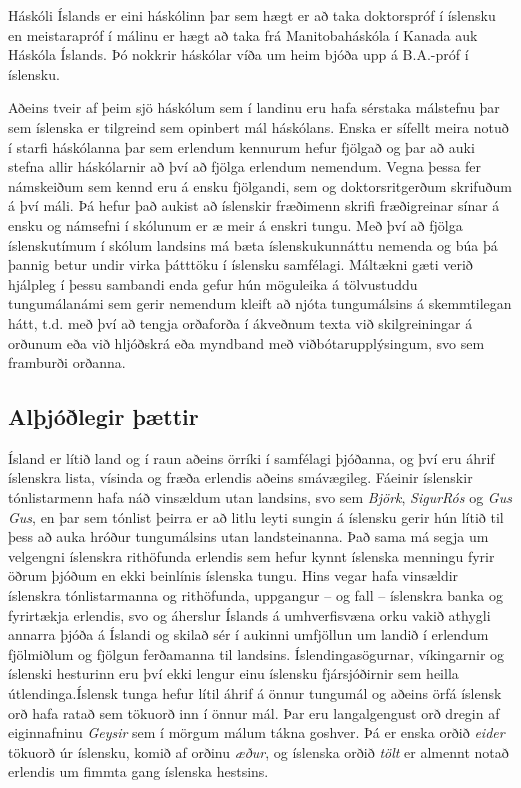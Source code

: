 \documentclass{../../metanetpaper}
\begin{document}
\begin{multicols}{2}
Háskóli Íslands er eini háskólinn þar sem hægt er að taka doktorspróf í íslensku en meistarapróf í málinu er hægt að taka frá Manitobaháskóla í Kanada auk Háskóla Íslands. Þó nokkrir háskólar víða um heim bjóða upp á B.A.-próf í íslensku.

Aðeins tveir af þeim sjö háskólum sem í landinu eru hafa sérstaka málstefnu þar sem íslenska er tilgreind sem opinbert mál háskólans. Enska er sífellt meira notuð í starfi háskólanna þar sem erlendum kennurum hefur fjölgað og þar að auki stefna allir háskólarnir að því að fjölga erlendum nemendum. Vegna þessa fer námskeiðum sem kennd eru á ensku fjölgandi, sem og doktorsritgerðum skrifuðum á því máli. Þá hefur það aukist að íslenskir fræðimenn skrifi fræðigreinar sínar á ensku og námsefni í skólunum er æ meir á enskri tungu\cite{isl1}. Með því að fjölga íslenskutímum í skólum landsins má bæta íslenskukunnáttu nemenda og búa þá þannig betur undir virka þátttöku í íslensku samfélagi. Máltækni gæti verið hjálpleg í þessu sambandi enda gefur hún möguleika á tölvustuddu tungumálanámi sem gerir nemendum kleift að njóta tungumálsins á skemmtilegan hátt, t.d. með því að tengja orðaforða í ákveðnum texta við skilgreiningar á orðunum eða við hljóðskrá eða myndband með viðbótarupplýsingum, svo sem framburði orðanna.
\subsection{Alþjóðlegir þættir}

Ísland er lítið land og í raun aðeins örríki í samfélagi þjóðanna, og því eru áhrif íslenskra lista, vísinda og fræða erlendis aðeins smávægileg. Fáeinir íslenskir tónlistarmenn hafa náð vinsældum utan landsins, svo sem \textit{Björk}, \textit{SigurRós} og \textit{Gus Gus}, en þar sem tónlist þeirra er að litlu leyti sungin á íslensku gerir hún lítið til þess að auka hróður tungumálsins utan landsteinanna. Það sama má segja um velgengni íslenskra rithöfunda erlendis sem hefur kynnt íslenska menningu fyrir öðrum þjóðum en ekki beinlínis íslenska tungu. Hins vegar hafa vinsældir íslenskra tónlistarmanna og rithöfunda, uppgangur -- og fall -- íslenskra banka og fyrirtækja erlendis, svo og áherslur Íslands á umhverfisvæna orku vakið athygli annarra þjóða á Íslandi og skilað sér í aukinni umfjöllun um landið í erlendum fjölmiðlum og fjölgun ferðamanna til landsins. Íslendingasögurnar, víkingarnir og íslenski hesturinn eru því ekki lengur einu íslensku fjársjóðirnir sem heilla útlendinga.Íslensk tunga hefur lítil áhrif á önnur tungumál og aðeins örfá íslensk orð hafa ratað sem tökuorð inn í önnur mál. Þar eru langalgengust orð dregin af eiginnafninu \textit{Geysir} sem í mörgum málum tákna goshver. Þá er enska orðið \textit{eider} tökuorð úr íslensku, komið af orðinu \textit{æður}, og íslenska orðið \textit{tölt} er almennt notað erlendis um fimmta gang íslenska hestsins.


\end{multicols}
\end{document}

